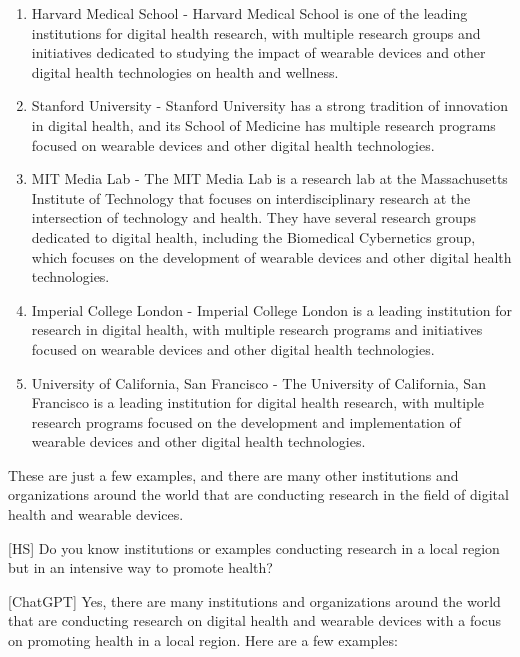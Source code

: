 \documentclass[
]{bxjsbook}
\providecommand{\tightlist}{%
  \setlength{\itemsep}{0pt}\setlength{\parskip}{0pt}}
\theoremstyle{definition}
\theoremstyle{definition}
\theoremstyle{definition}
\theoremstyle{definition}
\theoremstyle{remark}
\begin{document}
\begin{enumerate}
\def\labelenumi{\arabic{enumi}.}
\tightlist
\item
  Harvard Medical School - Harvard Medical School is one of the leading institutions for digital health research, with multiple research groups and initiatives dedicated to studying the impact of wearable devices and other digital health technologies on health and wellness.
\item
  Stanford University - Stanford University has a strong tradition of innovation in digital health, and its School of Medicine has multiple research programs focused on wearable devices and other digital health technologies.
\item
  MIT Media Lab - The MIT Media Lab is a research lab at the Massachusetts Institute of Technology that focuses on interdisciplinary research at the intersection of technology and health. They have several research groups dedicated to digital health, including the Biomedical Cybernetics group, which focuses on the development of wearable devices and other digital health technologies.
\item
  Imperial College London - Imperial College London is a leading institution for research in digital health, with multiple research programs and initiatives focused on wearable devices and other digital health technologies.
\item
  University of California, San Francisco - The University of California, San Francisco is a leading institution for digital health research, with multiple research programs focused on the development and implementation of wearable devices and other digital health technologies.
\end{enumerate}

These are just a few examples, and there are many other institutions and organizations around the world that are conducting research in the field of digital health and wearable devices.

{[}HS{]} Do you know institutions or examples conducting research in a local region but in an intensive way to promote health?

{[}ChatGPT{]} Yes, there are many institutions and organizations around the world that are conducting research on digital health and wearable devices with a focus on promoting health in a local region. Here are a few examples:
\end{document}
